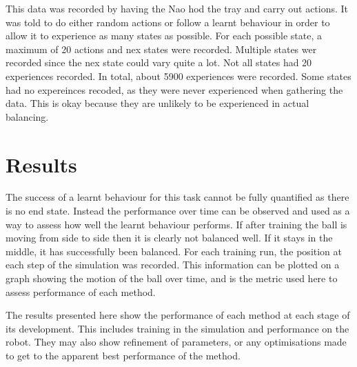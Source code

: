 \documentclass[12pt,a4paper]{article}
\begin{document}
This data was recorded by having the Nao hod the tray and carry out actions. It was told to do either random actions or follow a learnt behaviour in order to allow it to experience as many states as possible. For each possible state, a maximum of 20 actions and nex states were recorded. Multiple states wer recorded since the nex state could vary quite a lot. Not all states had 20 experiences recorded. In total, about 5900 experiences were recorded. Some states had no expereinces recoded, as they were never experienced when gathering the data. This is okay because they are unlikely to be experienced in actual balancing. 


\section{Results}
The success of a learnt behaviour for this task cannot be fully quantified as there is no end state. Instead the performance over time can be observed and used as a way to assess how well the learnt behaviour performs. If after training the ball is moving from side to side then it is clearly not balanced well. If it stays in the middle, it has successfully been balanced. For each training run, the position at each step of the simulation was recorded. This information can be plotted on a graph showing the motion of the ball over time, and is the metric used here to assess performance of each method. 

The results presented here show the performance of each method at each stage of its development. This includes training in the simulation and performance on the robot. They may also show refinement of parameters, or any optimisations made to get to the apparent best performance of the method. 
\end{document}
